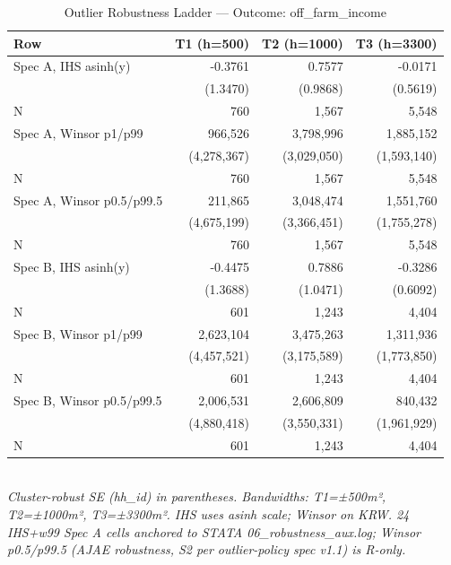 \begin{table}[t]
\centering
\caption{Outlier Robustness Ladder — Outcome: off_farm_income}
\label{tab:rob_outlier_off_farm_income_en}
\begin{tabular}{lrrr}
\toprule
Row & T1 (h=500) & T2 (h=1000) & T3 (h=3300) \\
\midrule
Spec A, IHS asinh(y) & -0.3761 & 0.7577 & -0.0171 \\
        & (1.3470) & (0.9868) & (0.5619) \\
N       & 760 & 1,567 & 5,548 \\
Spec A, Winsor p1/p99 & 966,526 & 3,798,996 & 1,885,152 \\
        & (4,278,367) & (3,029,050) & (1,593,140) \\
N       & 760 & 1,567 & 5,548 \\
Spec A, Winsor p0.5/p99.5 & 211,865 & 3,048,474 & 1,551,760 \\
        & (4,675,199) & (3,366,451) & (1,755,278) \\
N       & 760 & 1,567 & 5,548 \\
Spec B, IHS asinh(y) & -0.4475 & 0.7886 & -0.3286 \\
        & (1.3688) & (1.0471) & (0.6092) \\
N       & 601 & 1,243 & 4,404 \\
Spec B, Winsor p1/p99 & 2,623,104 & 3,475,263 & 1,311,936 \\
        & (4,457,521) & (3,175,589) & (1,773,850) \\
N       & 601 & 1,243 & 4,404 \\
Spec B, Winsor p0.5/p99.5 & 2,006,531 & 2,606,809 & 840,432 \\
        & (4,880,418) & (3,550,331) & (1,961,929) \\
N       & 601 & 1,243 & 4,404 \\
\bottomrule
\end{tabular}
\\
\footnotesize\textit{Cluster-robust SE (hh_id) in parentheses. Bandwidths: T1=±500m², T2=±1000m², T3=±3300m². IHS uses asinh scale; Winsor on KRW. 24 IHS+w99 Spec A cells anchored to STATA 06_robustness_aux.log; Winsor p0.5/p99.5 (AJAE robustness, S2 per outlier-policy spec v1.1) is R-only.}
\end{table}


